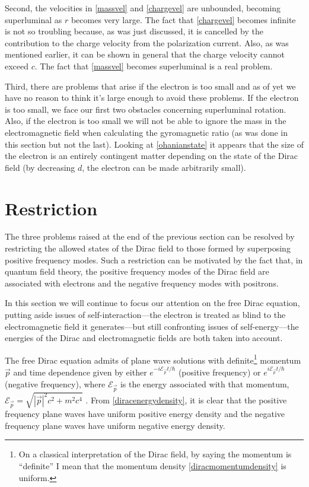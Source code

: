 \documentclass[12pt,secnumarabic,amsmath,amssymb,balancelastpage,nofootinbib]{article}
\begin{document}
Second, the velocities in \eqref{massvel} and \eqref{chargevel} are unbounded, becoming superluminal as $r$ becomes very large.  The fact that \eqref{chargevel} becomes infinite is not so troubling because, as was just discussed, it is cancelled by the contribution to the charge velocity from the polarization current.  Also, as was mentioned earlier, it can be shown in general that the charge velocity cannot exceed $c$.  The fact that \eqref{massvel} becomes superluminal is a real problem.

Third, there are problems that arise if the electron is too small and as of yet we have no reason to think it's large enough to avoid these problems.  If the electron is too small, we face our first two obstacles concerning superluminal rotation.  Also, if the electron is too small we will not be able to ignore the mass in the electromagnetic field when calculating the gyromagnetic ratio (as was done in this section but not the last).  Looking at \eqref{ohanianstate} it appears that the size of the electron is an entirely contingent matter depending on the state of the Dirac field (by decreasing $d$, the electron can be made arbitrarily small).



\section{Restriction}\label{restrictionsection}

The three problems raised at the end of the previous section can be resolved by restricting the allowed states of the Dirac field to those formed by superposing positive frequency modes.  Such a restriction can be motivated by the fact that, in quantum field theory, the positive frequency modes of the Dirac field are associated with electrons and the negative frequency modes with positrons.

In this section we will continue to focus our attention on the free Dirac equation, putting aside issues of self-interaction---the electron is treated as blind to the electromagnetic field it generates---but still confronting issues of self-energy---the energies of the Dirac and electromagnetic fields are both taken into account.

The free Dirac equation admits of plane wave solutions with definite\footnote{On a classical interpretation of the Dirac field, by saying the momentum is ``definite'' I mean that the momentum density \eqref{diracmomentumdensity} is uniform.} momentum $\vec{p}$ and time dependence given by either $e^{-i \mathcal{E}_{\vec{p}} t /\hbar}$ (positive frequency) or $e^{i \mathcal{E}_{\vec{p}} t/\hbar}$ (negative frequency), where $\mathcal{E}_{\vec{p}}$ is the energy associated with that momentum, $\mathcal{E}_{\vec{p}}=\sqrt{|\vec{p}|^2 c^2 + m^2 c^4}$ \citep[chapter 3]{bjorkendrell}.  From \eqref{diracenergydensity}, it is clear that the positive frequency plane waves have uniform positive energy density and the negative frequency plane waves have uniform negative energy density.
\end{document}

